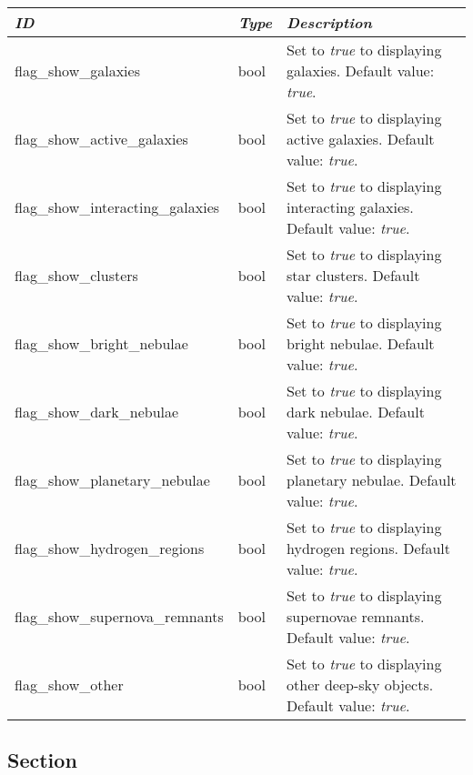 \begin{longtabu} to \textwidth {l|l|X}
\toprule
\emph{ID} & \emph{Type} & \emph{Description}\tabularnewline
\midrule
flag\_show\_galaxies & bool & Set to \emph{true}
to displaying galaxies. Default value: \emph{true}. \tabularnewline
\midrule
flag\_show\_active\_galaxies & bool & Set to
\emph{true} to displaying active galaxies. Default value: \emph{true}. \tabularnewline
\midrule
flag\_show\_interacting\_galaxies & bool & Set
to \emph{true} to displaying interacting galaxies. Default value: \emph{true}. \tabularnewline
\midrule
flag\_show\_clusters & bool & Set to \emph{true}
to displaying star clusters. Default value: \emph{true}. \tabularnewline
\midrule
flag\_show\_bright\_nebulae & bool & Set to
\emph{true} to displaying bright nebulae. Default value: \emph{true}. \tabularnewline
\midrule
flag\_show\_dark\_nebulae & bool & Set to
\emph{true} to displaying dark nebulae. Default value: \emph{true}. \tabularnewline
\midrule
flag\_show\_planetary\_nebulae & bool & Set to
\emph{true} to displaying planetary nebulae. Default value: \emph{true}. \tabularnewline
\midrule
flag\_show\_hydrogen\_regions & bool & Set to
\emph{true} to displaying hydrogen regions. Default value: \emph{true}. \tabularnewline
\midrule
flag\_show\_supernova\_remnants & bool & Set to
\emph{true} to displaying supernovae remnants. Default value: \emph{true}. \tabularnewline
\midrule
flag\_show\_other & bool & Set to \emph{true} to
displaying other deep-sky objects. Default value: \emph{true}. \tabularnewline
\bottomrule
\end{longtabu}

\subsection{Section }\label{section-gui}

